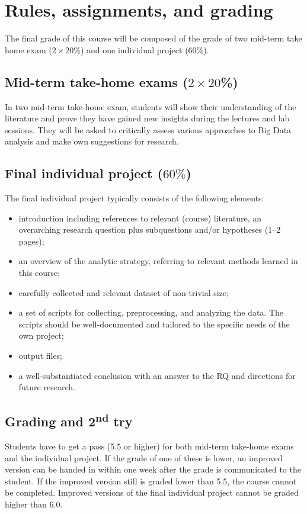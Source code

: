 \documentclass[a4paper,10pt]{report}
\begin{document}
\chapter{Rules, assignments, and grading}
The final grade of this course will be composed of the grade of two mid-term take home exam ($2 \times 20$\%) and one individual project (60\%).

\section{Mid-term take-home exams ($2 \times 20$\%)}
In two mid-term take-home exam, students will show their understanding of the literature and prove they have gained new insights during the lectures and lab sessions. They will be asked to critically assess various approaches to Big Data analysis and make own suggestions for research.

\section{Final individual project ($60\%$)}
The final individual project typically consists of the following elements:
\begin{itemize}
\item introduction including references to relevant (course) literature, an overarching research question plus subquestions and/or hypotheses (1–2 pages);
\item an overview of the analytic strategy, referring to relevant methods learned in this course;
\item carefully collected and relevant dataset of non-trivial size;
\item a set of scripts for collecting, preprocessing, and analyzing the data. The scripts should be well-documented and tailored to the specific needs of the own project;
\item output files;
\item a well-substantiated conclusion with an answer to the RQ and directions for future research.
\end{itemize}

\section{Grading and 2\textsuperscript{nd} try}
Students have to get a pass (5.5 or higher) for both mid-term take-home exams and the individual project. If the grade of one of these is lower, an improved version can be handed in within one week after the grade is communicated to the student. If the improved version still is graded lower than 5.5, the course cannot be completed. Improved versions of the final individual project cannot be graded higher than 6.0. 
\end{document}
